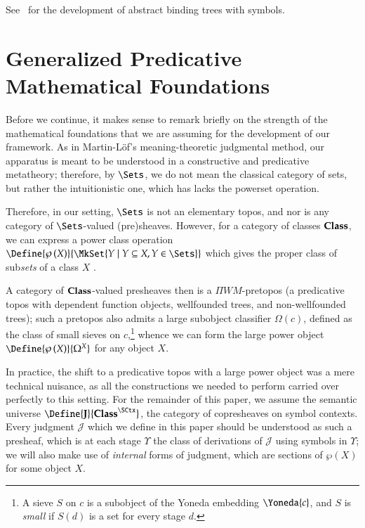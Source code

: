 \documentclass[11pt]{article}
\theoremstyle{definition}
\theoremstyle{notation}
\theoremstyle{remark}
\numberwithin{equation}{section}
\newcommand\Pow[1]{\wp\left(#1\right)}
\begin{document}
See~\cite{sterling-morrison:2015} for the development of abstract binding trees
with symbols. 

\section{Generalized Predicative Mathematical Foundations}

Before we continue, it makes sense to remark briefly on the strength of the
mathematical foundations that we are assuming for the development of our
framework. As in Martin-L\"of's meaning-theoretic judgmental method, our
apparatus is meant to be understood in a constructive and predicative
metatheory; therefore, by $\Sets$, we do not mean the classical category of
sets, but rather the intuitionistic one, which has lacks the powerset
operation.

Therefore, in our setting, $\Sets$ is not an elementary topos, and nor is any
category of $\Sets$-valued (pre)sheaves. However, for a category of classes
$\mathbf{Class}$, we can express a power class operation
$\Define{\Pow{X}}{\MkSet{Y\mid Y\subseteq X, Y\in\Sets}}$ which gives the
proper class of sub\emph{sets} of a class $X$ \cite{gambino:2002}.

A category of $\mathbf{Class}$-valued presheaves then is a $\Pi W M$-pretopos (a
predicative topos with dependent function objects, wellfounded trees, and
non-wellfounded trees); such a pretopos also admits a large subobject
classifier $\Omega(c)$, defined as the class of small sieves on
$c$,\footnote{A sieve $S$ on $c$ is a subobject of the Yoneda
embedding $\Yoneda{c}$, and $S$ is \emph{small} if $S(d)$ is a set for every
stage $d$.} whence we can form the large power object
$\Define{\Pow{X}}{\Omega^X}$ for any object $X$.

In practice, the shift to a predicative topos with a large power object was a
mere technical nuisance, as all the constructions we needed to perform carried
over perfectly to this setting. For the remainder of this paper, we assume the
semantic universe $\Define{\SemU}{\Classes^\SCtx}$, the category of
copresheaves on symbol contexts. Every judgment $\mathcal{J}$ which we define
in this paper should be understood as such a presheaf, which is at each stage
$\Upsilon$ the class of derivations of $\mathcal{J}$ using symbols in
$\Upsilon$; we will also make use of \emph{internal} forms of judgment, which
are sections of $\Pow{X}$ for some object $X$.
\end{document}
